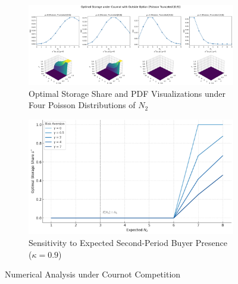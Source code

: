 \begin{figure}[ht!]
    \centering
    \begin{subfigure}{\textwidth}
        \centering
        \includegraphics[width=\textwidth, keepaspectratio=true]{model_figures/3D_cournot.png}
        \caption{Optimal Storage Share and PDF Visualizations under Four Poisson Distributions of $N_2$}
        \label{Fig: 3D Cournot}
    \end{subfigure}
    
    \vspace{10mm} %
    
    \begin{subfigure}{\textwidth}
        \centering
        \includegraphics[width=\textwidth, keepaspectratio=true]{model_figures/buyer_count_sensitivity_cournot.png}
        \caption{Sensitivity to Expected Second-Period Buyer Presence ($\kappa=0.9$)}
        \label{Fig: Cournot sensitivity}
    \end{subfigure}

    \caption{Numerical Analysis under Cournot Competition}
\end{figure}



